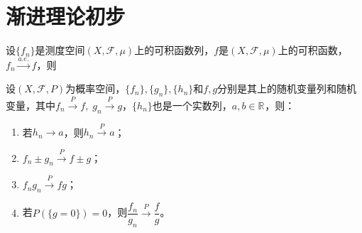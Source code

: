 \chapter{渐进理论初步}

\begin{theorem}
	设$\{f_n\}$是测度空间$(X,\mathscr{F},\mu)$上的可积函数列，$f$是$(X,\mathscr{F},\mu)$上的可积函数，$f_n\overset{a.e.}{\longrightarrow}f$，则
\end{theorem}
\begin{property}\label{prop:ConvergenceInProbability}
	设$(X,\mathscr{F},P)$为概率空间，$\{f_n\},\{g_n\},\{h_n\}$和$f,g$分别是其上的随机变量列和随机变量，其中$f_n\overset{P}{\longrightarrow}f,\;g_n\overset{P}{\longrightarrow}g$，$\{h_n\}$也是一个实数列，$a,b\in\mathbb{R}^{}$，则：
	\begin{enumerate}
		\item 若$h_n\to a$，则$h_n\overset{P}{\longrightarrow}a$；
		\item $f_n\pm g_n\overset{P}{\longrightarrow}f\pm g$；
		\item $f_ng_n\overset{P}{\longrightarrow}fg$；
		\item 若$P(\{g=0\})=0$，则$\dfrac{f_n}{g_n}\overset{P}{\longrightarrow}\dfrac{f}{g}$。
	\end{enumerate}
\end{property}
